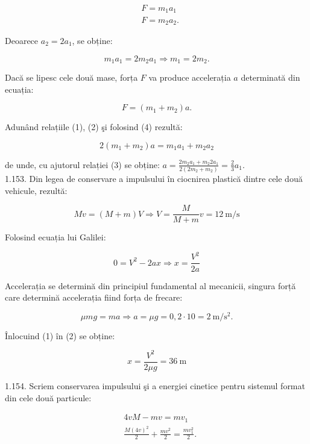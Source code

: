 \begin{align*}
& F=m_{1} a_{1}  \tag{1}\\
& F=m_{2} a_{2} . \tag{2}
\end{align*}


Deoarece $a_{2}=2 a_{1}$, se obține:


\begin{equation*}
m_{1} a_{1}=2 m_{2} a_{1} \Rightarrow m_{1}=2 m_{2} . \tag{3}
\end{equation*}


Dacă se lipesc cele două mase, forța $F$ va produce accelerația $a$ determinată din ecuația:


\begin{equation*}
F=\left(m_{1}+m_{2}\right) a . \tag{4}
\end{equation*}


Adunând relațiile (1), (2) şi folosind (4) rezultă:

$$
2\left(m_{1}+m_{2}\right) a=m_{1} a_{1}+m_{2} a_{2}
$$

de unde, cu ajutorul relației (3) se obține: $a=\frac{2 m_{2} a_{1}+m_{2} 2 a_{1}}{2\left(2 m_{2}+m_{2}\right)}=\frac{2}{3} a_{1}$.\\
1.153. Din legea de conservare a impulsului în ciocnirea plastică dintre cele două vehicule, rezultă:

$$
M v=(M+m) V \Rightarrow V=\frac{M}{M+m} v=12 \mathrm{~m} / \mathrm{s}
$$

Folosind ecuația lui Galilei:


\begin{equation*}
0=V^{2}-2 a x \Rightarrow x=\frac{V^{2}}{2 a} \tag{1}
\end{equation*}


Accelerația se determină din principiul fundamental al mecanicii, singura forță care determină accelerația fiind forța de frecare:

$$
\mu m g=m a \Rightarrow a=\mu g=0,2 \cdot 10=2 \mathrm{~m} / \mathrm{s}^{2} .
$$

Înlocuind (1) în (2) se obține:

$$
x=\frac{V^{2}}{2 \mu g}=36 \mathrm{~m}
$$

1.154. Scriem conservarea impulsului şi a energiei cinetice pentru sistemul format din cele două particule:

$$
\begin{aligned}
& 4 v M-m v=m v_{1} \\
& \frac{M(4 v)^{2}}{2}+\frac{m v^{2}}{2}=\frac{m v_{1}^{2}}{2} .
\end{aligned}
$$

